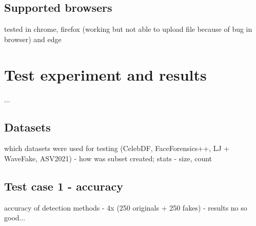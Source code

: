 \section{Supported browsers}
tested in chrome, firefox (working but not able to upload file because of bug in browser) and edge

\chapter{Test experiment and results}

...

\section{Datasets}
\label{section:datasets}
which datasets were used for testing (CelebDF, FaceForensics++, LJ + WaveFake, ASV2021) - how was subset created; stats - size, count

\section{Test case 1 - accuracy}
accuracy of detection methods - 4x (250 originals + 250 fakes) - results no so good...

